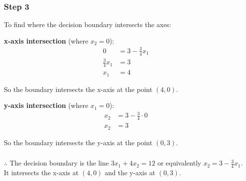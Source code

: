 \documentclass{article}
\begin{document}
\subsubsection*{Step 3}
\parbox{\textwidth}{
To find where the decision boundary intersects the axes:

\textbf{x-axis intersection} (where $x_2 = 0$):
\begin{align}
0 &= 3 - \frac{3}{4}x_1\\
\frac{3}{4}x_1 &= 3\\
x_1 &= 4
\end{align}

So the boundary intersects the x-axis at the point $(4, 0)$.

\textbf{y-axis intersection} (where $x_1 = 0$):
\begin{align}
x_2 &= 3 - \frac{3}{4} \cdot 0\\
x_2 &= 3
\end{align}

So the boundary intersects the y-axis at the point $(0, 3)$.
}

\begin{center}
\end{center}

\subsubsection*{\normalfont}{$\therefore$ The decision boundary is the line $3x_1 + 4x_2 = 12$ or equivalently $x_2 = 3 - \frac{3}{4}x_1$. It intersects the x-axis at $(4, 0)$ and the y-axis at $(0, 3)$.}
\end{document}
